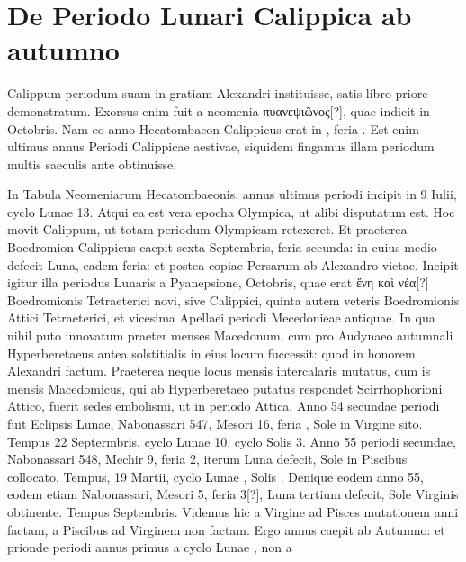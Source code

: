 \section{De Periodo Lunari Calippica ab autumno}
%
Calippum periodum suam in gratiam Alexandri instituisse,
satis libro priore demonstratum.
Exorsus enim fuit a neomenia
\textgreek{πυανεψιῶνος[?]}, quae indicit in  Octobris.
Nam eo anno
Hecatombaeon Calippicus erat in , feria .
Est enim ultimus
annus Periodi Calippicae aestivae, siquidem fingamus illam periodum
multis saeculis ante obtinuisse.
\begin{table}[htbp]
  
\end{table}
%
In Tabula Neomeniarum Hecatombaeonis,
annus ultimus periodi incipit in 9 Iulii, cyclo Lunae 13.
Atqui ea est vera epocha Olympica, ut alibi disputatum est.
Hoc
movit Calippum, ut totam periodum Olympicam retexeret.
Et
praeterea Boedromion Calippicus caepit sexta Septembris, feria secunda:
in cuius medio defecit Luna, eadem feria: et postea copiae
Persarum ab Alexandro victae.
Incipit igitur illa periodus Lunaris
a Pyanepsione,  Octobris, quae erat
 \textgreek{ἔνη καὶ νέα[?]} Boedromionis Tetraeterici
novi, sive Calippici, quinta autem veteris Boedromionis
Attici Tetraeterici, et vicesima Apellaei periodi Mecedonieae antiquae.
In qua nihil puto innovatum praeter menses Macedonum, cum
pro Audynaeo autumnali Hyperberetaeus antea solstitialis in eius
locum fuccessit: quod in honorem Alexandri factum.
Praeterea neque
locus mensis intercalaris mutatus, cum is mensis Macedomicus,
qui ab Hyperberetaeo putatus respondet Scirrhophorioni Attico,
fuerit sedes embolismi, ut in periodo Attica.
Anno 54 secundae periodi
fuit Eclipsis Lunae, Nabonassari 547, Mesori 16, feria , Sole
in Virgine sito.
Tempus 22 Septermbris, cyclo Lunae 10, cyclo
Solis 3.
Anno 55 periodi secundae, Nabonassari 548, Mechir 9,
feria 2, iterum Luna defecit, Sole in Piscibus collocato.
Tempus, 19
Martii, cyclo Lunae , Solis .
Denique eodem anno 55, eodem
etiam Nabonassari, Mesori 5, feria
3[?], Luna tertium defecit, Sole 
Virginis obtinente.
Tempus 
Septembris.
Videmus hic a Virgine
ad Pisces mutationem anni factam,
a Piscibus ad Virginem non
factam.
Ergo annus caepit ab Autumno:
et prionde periodi annus
primus a cyclo Lunae , non a
